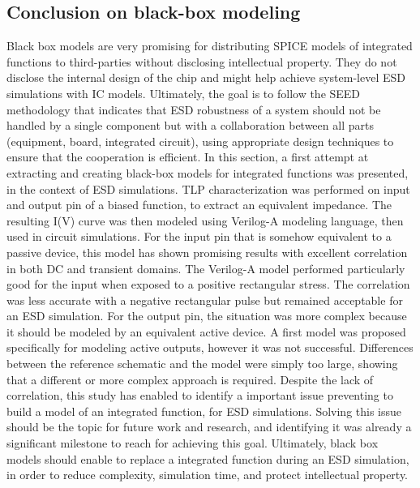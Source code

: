 \subsection{Conclusion on black-box modeling}


Black box models are very promising for distributing SPICE models of integrated functions to third-parties without disclosing intellectual property.
They do not disclose the internal design of the chip and might help achieve system-level ESD simulations with IC models.
Ultimately, the goal is to follow the SEED \cite{seed} methodology that indicates that ESD robustness of a system should not be handled by a single component but with a collaboration between all parts (equipment, board, integrated circuit), using appropriate design techniques to ensure that the cooperation is efficient.
In this section, a first attempt at extracting and creating black-box models for integrated functions was presented, in the context of ESD simulations.
TLP characterization was performed on input and output pin of a biased function, to extract an equivalent impedance.
The resulting I(V) curve was then modeled using Verilog-A modeling language, then used in circuit simulations.
For the input pin that is somehow equivalent to a passive device, this model has shown promising results with excellent correlation in both DC and transient domains.
The Verilog-A model performed particularly good for the input when exposed to a positive rectangular stress.
The correlation was less accurate with a negative rectangular pulse but remained acceptable for an ESD simulation.
For the output pin, the situation was more complex because it should be modeled by an equivalent active device.
A first model was proposed specifically for modeling active outputs, however it was not successful.
Differences between the reference schematic and the model were simply too large, showing that a different or more complex approach is required.
Despite the lack of correlation, this study has enabled to identify a important issue preventing to build a model of an integrated function, for ESD simulations.
Solving this issue should be the topic for future work and research, and identifying it was already a significant milestone to reach for achieving this goal.
Ultimately, black box models should enable to replace a integrated function during an ESD simulation, in order to reduce complexity, simulation time, and protect intellectual property.

